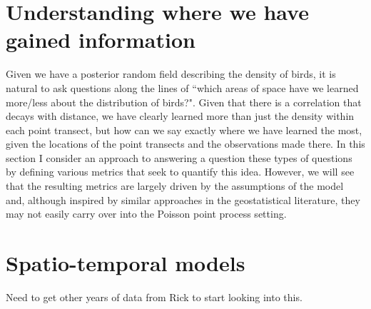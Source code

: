 \documentclass[12pt]{article}
\begin{document}
\section*{Understanding where we have gained information}

Given we have a posterior random field describing the density of birds, it is natural to ask questions along the lines of ``which areas of space have we learned more/less about the distribution of birds?".  Given that there is a correlation that decays with distance, we have clearly learned more than just the density within each point transect, but how can we say exactly where we have learned the most, given the locations of the point transects and the observations made there.  In this section I consider an approach to answering a question these types of questions by defining various metrics that seek to quantify this idea.  However, we will see that the resulting metrics are largely driven by the assumptions of the model and, although inspired by similar approaches in the geostatistical literature, they may not easily carry over into the Poisson point process setting.  

\section*{Spatio-temporal models}

Need to get other years of data from Rick to start looking into this.  
\end{document}
